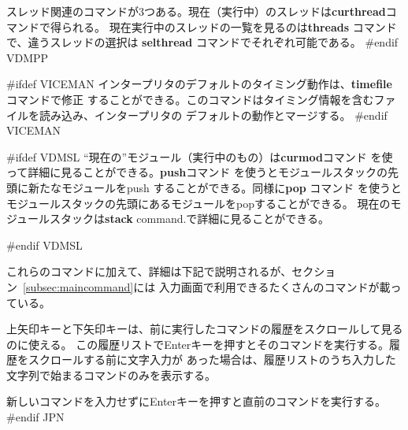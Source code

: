 \documentclass[\pformat,12pt]{article}
\newcommand{\guicmd}[1]{{\sf #1}}
\newcommand{\guicmd}[1]{{\gt #1}}
\begin{document}
スレッド関連のコマンドが3つある。現在（実行中）のスレッドは\textbf{curthread}コマンドで得られる。
現在実行中のスレッドの一覧を見るのは\textbf{threads} コマンドで、違うスレッドの選択は
\textbf{selthread} コマンドでそれぞれ可能である。
#endif VDMPP

#ifdef VICEMAN
インタープリタのデフォルトのタイミング動作は、\textbf{timefile} コマンドで修正
することができる。このコマンドはタイミング情報を含むファイルを読み込み、インタープリタの
デフォルトの動作とマージする。
#endif VICEMAN

#ifdef VDMSL
  ``現在の''モジュール（実行中のもの）は\textbf{curmod}コマンド 
  を使って詳細に見ることができる。\textbf{push}コマンド 
  を使うとモジュールスタックの先頭に新たなモジュールをpush
  することができる。同様に\textbf{pop} コマンド 
  を使うとモジュールスタックの先頭にあるモジュールをpopすることができる。
  現在のモジュールスタックは\textbf{stack} command.で詳細に見ることができる。
  
#endif VDMSL

これらのコマンドに加えて、詳細は下記で説明されるが、セクション~\ref{subsec:maincommand}には
\guicmd{入力}画面で利用できるたくさんのコマンドが載っている。

上矢印キーと下矢印キーは、前に実行したコマンドの履歴をスクロールして見るのに使える。
この履歴リストでEnterキーを押すとそのコマンドを実行する。履歴をスクロールする前に文字入力が
あった場合は、履歴リストのうち入力した文字列で始まるコマンドのみを表示する。

新しいコマンドを入力せずにEnterキーを押すと直前のコマンドを実行する。
#endif JPN
\end{document}

